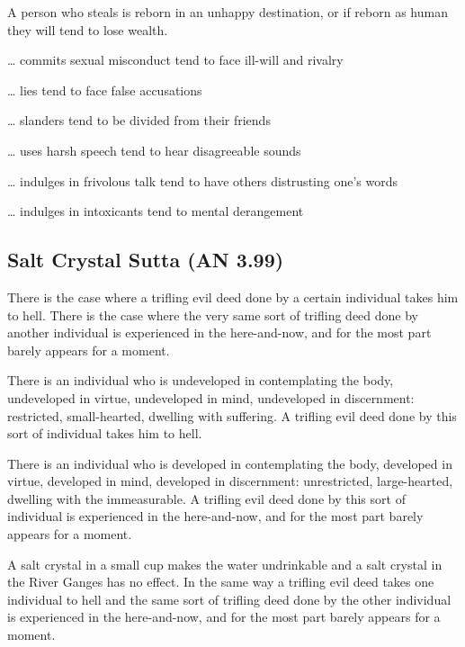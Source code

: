 \documentclass[a4 paper, 12pt]{article}
\begin{document}
A person who steals is reborn in an unhappy destination, or if reborn as human they will tend to lose wealth.

… commits sexual misconduct \textrightarrow \hspace{1mm} tend to face ill-will and rivalry

… lies \textrightarrow \hspace{1mm} tend to face false accusations

… slanders \textrightarrow \hspace{1mm} tend to be divided from their friends

… uses harsh speech \textrightarrow \hspace{1mm} tend to hear disagreeable sounds

… indulges in frivolous talk \textrightarrow \hspace{1mm} tend to have others distrusting one’s words

… indulges in intoxicants \textrightarrow \hspace{1mm} tend to mental derangement

\subsection*{Salt Crystal Sutta (AN 3.99)}

There is the case where a trifling evil deed done by a certain individual takes him to hell. There is the case where the very same sort of trifling deed done by another individual is experienced in the here-and-now, and for the most part barely appears for a moment.

There is an individual who is undeveloped in contemplating the body, undeveloped in virtue, undeveloped in mind, undeveloped in discernment: restricted, small-hearted, dwelling with suffering. A trifling evil deed done by this sort of individual takes him to hell.

There is an individual who is developed in contemplating the body, developed in virtue, developed in mind, developed in discernment: unrestricted, large-hearted, dwelling with the immeasurable. A trifling evil deed done by this sort of individual is experienced in the here-and-now, and for the most part barely appears for a moment. 

A salt crystal in a small cup makes the water undrinkable and a salt crystal in the River Ganges has no effect. In the same way a trifling evil deed takes one individual to hell and the same sort of trifling deed done by the other individual is experienced in the here-and-now, and for the most part barely appears for a moment.
\end{document}
